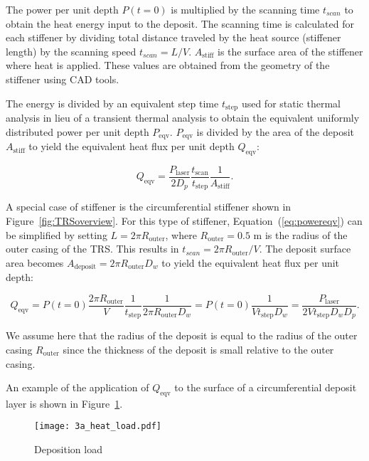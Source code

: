 The power per unit depth $P(t=0)$ is multiplied by the scanning time $t_{scan}$ to obtain the heat energy input to the deposit. The scanning time is calculated for each stiffener by dividing total distance traveled by the heat source (stiffener length) by the scanning speed $t_{scan} = L/V$. $A_{\textrm{stiff}}$ is the surface area of the stiffener where heat is applied. These values are obtained from the geometry of the stiffener using \ac{CAD} tools.

The energy is divided by an equivalent step time $t_{\textrm{step}}$ used for static thermal analysis in lieu of a transient thermal analysis to obtain the equivalent uniformly distributed power per unit depth $P_{\textrm{eqv}}$. $P_{\textrm{eqv}}$ is divided by the area of the deposit $A_{\textrm{stiff}}$ to yield the equivalent heat flux per unit depth $Q_{\textrm{eqv}}$:

\begin{equation}
	\label{eq:powereqv}
	Q_{\textrm{eqv}} = \dfrac{P_{\textrm{laser}}}{2D_{p}}\dfrac{t_{\textrm{scan}}}{t_{\textrm{step}}}\dfrac{1}{A_{\textrm{stiff}}}.
\end{equation}

A special case of stiffener is the circumferential stiffener shown in Figure~\ref{fig:TRSoverview}. For this type of stiffener, Equation~(\ref{eq:powereqv}) can be simplified by setting $L = 2\pi R_{\textrm{outer}}$, where $R_{\textrm{outer}} = 0.5$ m is the radius of the outer casing of the \ac{TRS}. This results in $t_{scan} = 2\pi R_{\textrm{outer}}/V$. The deposit surface area becomes $A_{\textrm{deposit}} = 2\pi {R_{\textrm{outer}}}D_w$ to yield the equivalent heat flux per unit depth:

\begin{equation}
	\label{eq:powereqvcirc}
	Q_{\textrm{eqv}} = P(t=0)\dfrac{2\pi R_{\textrm{outer}}}{V}\dfrac{1}{t_{\textrm{step}}}\dfrac{1}{2\pi {R_{\textrm{outer}}}D_w} = P(t=0)\dfrac{1}{{V}t_{\textrm{step}}D_w} = \dfrac{P_{\textrm{laser}}}{{2V}t_{\textrm{step}}D_wD_p}.
\end{equation}

We assume here that the radius of the deposit is equal to the radius of the outer casing $R_{\textrm{outer}}$ since the thickness of the deposit is small relative to the outer casing.

An example of the application of $Q_{\textrm{eqv}}$ to the surface of a circumferential deposit layer is shown in Figure~\ref{fig:depload}.

\begin{figure}[h!]
    \centering
    \texttt{[image: 3a\_heat\_load.pdf]}
    \caption{ \label{fig:depload} Deposition load }
\end{figure}

